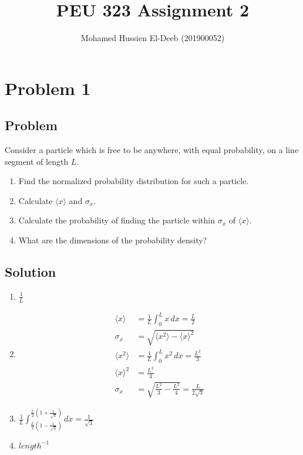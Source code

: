 \documentclass[12pt]{article}
\title{PEU 323 Assignment 2}
\author{Mohamed Hussien El-Deeb (201900052)}
\date{}
\begin{document}
\maketitle
\tableofcontents

\section{Problem 1}

\subsection{Problem}

Consider a particle which is free to be anywhere, with equal probability, on a line segment of length $L$.

\renewcommand{\labelenumi}{(\alph{enumi})}
\begin{enumerate}
    \item Find the normalized probability distribution for such a particle.
    \item Calculate $\langle x\rangle $ and $\sigma_{x}$.
    \item Calculate the probability of finding the particle within $\sigma_{x}$ of $\langle x\rangle $.
    \item What are the dimensions of the probability density?
\end{enumerate}

\subsection{Solution}

\begin{enumerate}
    \item $\frac{1}{L} $
    \item \begin{align*}
              \langle x\rangle      & = \frac{1}{L} \int_{0}^{L} x\,dx = \frac{L}{2}               \\
              \sigma_{x}            & = \sqrt{\langle x^2 \rangle - {\langle x \rangle}^2}         \\
              \langle x^2 \rangle   & = \frac{1}{L} \int_{0}^{L} x^2\,dx = \frac{L^2}{3}           \\
              {\langle x \rangle}^2 & = \frac{L^2}{4}                                              \\
              \sigma_{x}            & = \sqrt{\frac{L^2}{3} - \frac{L^2}{4}} = \frac{L}{2\sqrt{3}}
          \end{align*}
    \item $\frac{1}{L} \int_{\frac{L}{2} (1 - \frac{1}{\sqrt{3}})}^{\frac{L}{2} (1 + \frac{1}{\sqrt{3}})}dx = \frac{1}{\sqrt{3}}$
    \item $length^{-1}$
\end{enumerate}
\end{document}
